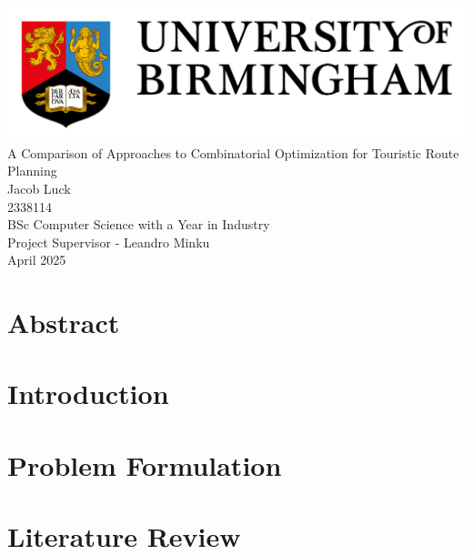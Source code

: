 \documentclass[a4paper,12pt]{article}
\begin{document}
    \begin{titlepage}
        \centering
        \includegraphics[width = 1\textwidth]{UoB_Logo}\\[10ex]
        \Huge{A Comparison of Approaches to Combinatorial Optimization for Touristic Route Planning}\\[14ex]
        \LARGE{Jacob Luck}\\
        \large{2338114}\\[2ex]
        \Large{BSc Computer Science with a Year in Industry}\\
        \Large{Project Supervisor - Leandro Minku}\\[2ex]
        \large{April 2025}
    \end{titlepage}

    \tableofcontents

    \pagebreak

    \section*{Abstract}

    \section{Introduction}\label{sec:introduction}

    \pagebreak
    
    \section{Problem Formulation}\label{sec:problem-formulation}

    \pagebreak

    \section{Literature Review}\label{sec:literature-review}
\end{document}
